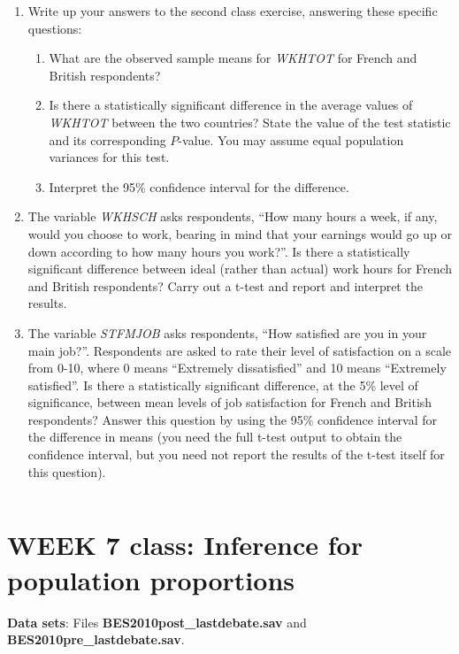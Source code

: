 \begin{enumerate}
\item
Write up your answers to the second class exercise, answering these specific
questions:
\begin{enumerate}
\item
What are the observed sample means for \emph{WKHTOT} for French and British respondents?
\item
Is there a statistically significant difference in the average values
of \emph{WKHTOT} between the two countries? State the value of the test statistic and its
corresponding $P$-value. You may assume equal population variances for this test.
\item
Interpret the 95\% confidence interval for the difference.
\end{enumerate}
\item
The variable \emph{WKHSCH} asks respondents,
``How many hours a week, if any, would you choose to work, bearing in
mind that your earnings would go up or down according to
how many hours you work?''. Is there a statistically significant difference between ideal
(rather than actual) work hours for French and British respondents? Carry out a t-test
and report and interpret the results.
\item
The variable \emph{STFMJOB} asks respondents,
``How satisfied are you in your main job?''. Respondents are asked to rate their
level of satisfaction on a scale from 0-10, where
0 means ``Extremely dissatisfied'' and 10 means ``Extremely satisfied''. Is there a statistically
significant difference, at the 5\% level of significance, between mean levels of job satisfaction
for French and British respondents? Answer this question by using the 95\% confidence interval for
the difference in means (you need the full t-test output to obtain the confidence interval, but you
need not report the results of the t-test itself for this question).
\end{enumerate}



\newpage
$\;$
\newpage


\section[Week 7: Inference for proportions]{WEEK 7 class: Inference for population proportions}

\textbf{Data sets}: Files
\textbf{BES2010post\_lastdebate.sav} and
\textbf{BES2010pre\_lastdebate.sav}.


